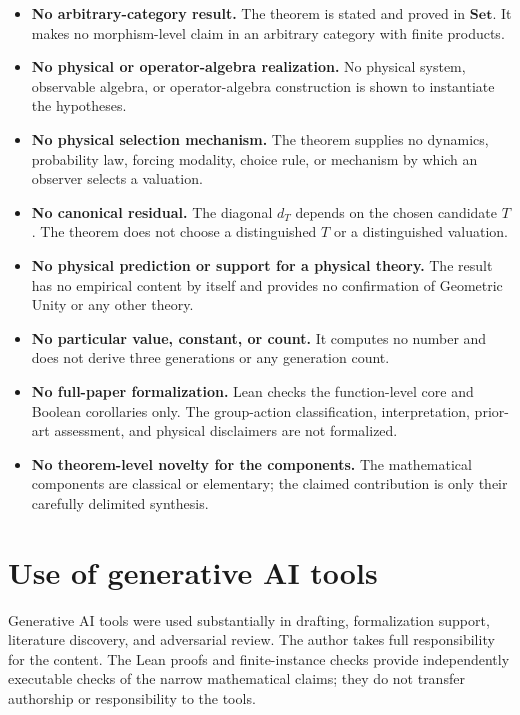 \documentclass[11pt]{article}
\theoremstyle{definition}
\theoremstyle{remark}
\begin{document}
\begin{itemize}
\item \textbf{No arbitrary-category result.} The theorem is stated and proved in $\mathbf{Set}$. It makes no morphism-level claim in an arbitrary category with finite products.
\item \textbf{No physical or operator-algebra realization.} No physical system, observable algebra, or operator-algebra construction is shown to instantiate the hypotheses.
\item \textbf{No physical selection mechanism.} The theorem supplies no dynamics, probability law, forcing modality, choice rule, or mechanism by which an observer selects a valuation.
\item \textbf{No canonical residual.} The diagonal $d_T$ depends on the chosen candidate $T$. The theorem does not choose a distinguished $T$ or a distinguished valuation.
\item \textbf{No physical prediction or support for a physical theory.} The result has no empirical content by itself and provides no confirmation of Geometric Unity or any other theory.
\item \textbf{No particular value, constant, or count.} It computes no number and does not derive three generations or any generation count.
\item \textbf{No full-paper formalization.} Lean checks the function-level core and Boolean corollaries only. The group-action classification, interpretation, prior-art assessment, and physical disclaimers are not formalized.
\item \textbf{No theorem-level novelty for the components.} The mathematical components are classical or elementary; the claimed contribution is only their carefully delimited synthesis.
\end{itemize}

\section*{Use of generative AI tools}

Generative AI tools were used substantially in drafting, formalization support, literature discovery, and adversarial review. The author takes full responsibility for the content. The Lean proofs and finite-instance checks provide independently executable checks of the narrow mathematical claims; they do not transfer authorship or responsibility to the tools.
\end{document}
